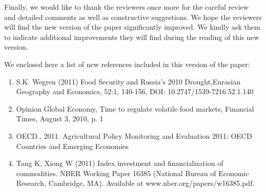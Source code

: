 \documentclass[a4paper,12pt]{article}
\begin{document}
\vskip1cm
Finally, we would like to thank the reviewers once more for the careful review and detailed comments as well as constructive suggestions. We hope the reviewers will find the new version of the paper significantly improved. We kindly ask them to indicate additional improvements they will find during the reading of this new version. 

\vskip1cm
We enclosed here a list of new references included in this version of the paper:

\begin{enumerate}
    \item S.K. Wegren (2011) Food Security and Russia's 2010 Drought,Eurasian Geography and Economics, 52:1, 140-156, DOI: 10.2747/1539-7216.52.1.140

    \item Opinion Global Economy, Time to regulate volatile food markets, Financial Times, August 3, 2010, p. 1

    \item OECD., 2011. Agricultural Policy Monitoring and Evaluation 2011: OECD Countries and Emerging Economies

    \item Tang K, Xiong W (2011) Index investment and financialization of commodities. NBER Working Paper 16385 (National Bureau of Economic Research, Cambridge, MA). Available at www.nber.org/papers/w16385.pdf.


\end{enumerate}
\end{document}
